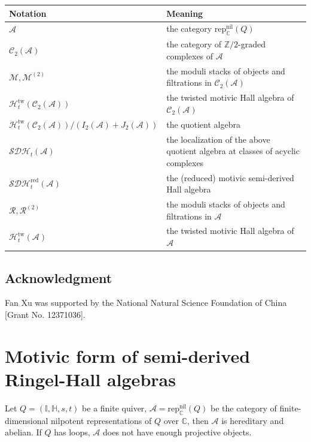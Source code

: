 \documentclass[12pt]{amsart}
\theoremstyle{definition}
\numberwithin{equation}{section}
\begin{document}
\begin{center}
\begin{tabular}{@{}p{}p{}@{}}
\hline
Notation & Meaning \\
\hline
$\mathcal{A}$ & the category $\mathrm{rep}^{\mathrm{nil}}_{\mathbb{C}}(Q)$ \\
$\mathcal{C}_2(\mathcal{A})$ & the category of $\mathbb{Z}/2$-graded complexes of $\mathcal{A}$ \\
$\mathcal{M},\mathcal{M}^{(2)}$ & the moduli stacks of objects and filtrations in $\mathcal{C}_2(\mathcal{A})$ \\
$ \mathcal{H}_t^{\mathrm{tw}}(\mathcal{C}_2(\mathcal{A}))  $ & the twisted motivic Hall algebra of $\mathcal{C}_2(\mathcal{A})$\\
$ \mathcal{H}_t^{\mathrm{tw}}(\mathcal{C}_2(\mathcal{A}))/(I_2(\mathcal{A})+J_2(\mathcal{A})) $ & the quotient algebra \\
$\mathcal{SDH}_t(\mathcal{A})$ & the localization of the above quotient algebra at classes of acyclic complexes \\
$\mathcal{SDH}_t^{\mathrm{red}}(\mathcal{A})$ & the (reduced) motivic semi-derived Hall algebra \\
$ \mathcal{R},\mathcal{R}^{(2)} $ & the moduli stacks of objects and filtrations in $ \mathcal{A} $\\
$ \mathcal{H}_t^{\mathrm{tw}}(\mathcal{A})  $ & the twisted motivic Hall algebra of $\mathcal{A}$\\
\hline
\end{tabular}
\end{center}


\subsection{Acknowledgment}\;

Fan Xu was supported by the National Natural Science Foundation of China [Grant No. 12371036].

\newpage



\section{Motivic form of semi-derived Ringel-Hall algebras}
\label{Motivic form of semi-derived Ringel-Hall algebras}

Let $ Q = (\mathbb{I},\mathbb{H},s,t)$ be a finite quiver, $ \mathcal{A}= \mathrm{rep}^{\mathrm{nil}}_{\mathbb{C}}(Q) $ be the category of finite-dimensional nilpotent representations of $ Q $ over $ \mathbb{C} $, then $ \mathcal{A} $ is hereditary and abelian. 
If $ Q $ has loops, $ \mathcal{A} $ does not have enough projective objects.
\end{document}

